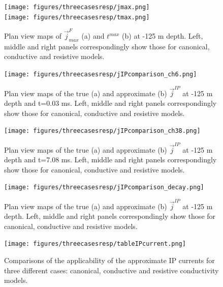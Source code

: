 \documentclass[a4paper, 11pt]{article}
\renewcommand {\j}  { {\vec j} }
\begin{document}
\begin{figure}[htb]
  \centering  \texttt{[image: figures/threecasesresp/jmax.png]}\\
  \centering  \texttt{[image: figures/threecasesresp/tmax.png]}
  \caption{Plan view maps of $\j^{F}_{max}$ (a) and $t^{max}$ (b) at -125 m depth. Left, middle and right panels correspondingly show those for canonical, conductive and resistive models.}
  \label{F:jmaxtmax}
\end{figure}

\begin{figure}[htb]
\centering  
    \texttt{[image: figures/threecasesresp/jIPcomparison\_ch6.png]}
    \caption{Plan view maps of the true (a) and approximate (b) $\j^{IP}$ at -125 m depth and t=0.03 ms. Left, middle and right panels correspondingly show those for canonical, conductive and resistive models.}
  \label{F:jIPcomparison_early}
\end{figure}

\begin{figure}[htb]
  \centering  \texttt{[image: figures/threecasesresp/jIPcomparison\_ch38.png]}
  \caption{Plan view maps of the true (a) and approximate (b) $\j^{IP}$ at -125 m depth and t=7.08 ms. Left, middle and right panels correspondingly show those for canonical, conductive and resistive models.}
  \label{F:jIPcomparison_late}
\end{figure}


\begin{figure}[htb]
  \centering  \texttt{[image: figures/threecasesresp/jIPcomparison\_decay.png]}\\
  \caption{Plan view maps of the true (a) and approximate (b) $\j^{IP}$ at -125 m depth. Left, middle and right panels correspondingly show those for canonical, conductive and resistive models.}
  \label{F:jIPcomparison_decay}
\end{figure}

\begin{figure}[htb]
  \centering  \texttt{[image: figures/threecasesresp/tableIPcurrent.png]}
  \caption{Comparisons of the applicability of the approximate IP currents for three different cases: canonical, conductive and resistive conductivity models. }
  \label{F:tableIPcurrent}
\end{figure}

\clearpage

\end{document}
